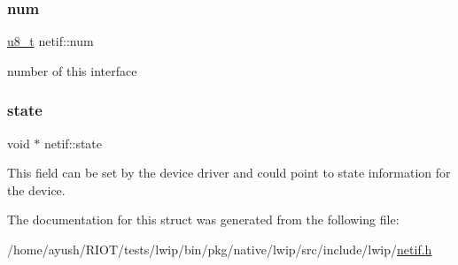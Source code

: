 \subsubsection{\texorpdfstring{num}{num}}
{\footnotesize\ttfamily \hyperlink{group__compiler__abstraction_ga4caecabca98b43919dd11be1c0d4cd8e}{u8\+\_\+t} netif\+::num}

number of this interface \mbox{\label{structnetif_ad61510fed9cecbafc268ca0424dbd34e}} 
\subsubsection{\texorpdfstring{state}{state}}
{\footnotesize\ttfamily void $\ast$ netif\+::state}

This field can be set by the device driver and could point to state information for the device. 

The documentation for this struct was generated from the following file\+:\begin{DoxyCompactItemize}
\item 
/home/ayush/\+R\+I\+O\+T/tests/lwip/bin/pkg/native/lwip/src/include/lwip/\hyperlink{native_2lwip_2src_2include_2lwip_2netif_8h}{netif.\+h}\end{DoxyCompactItemize}
